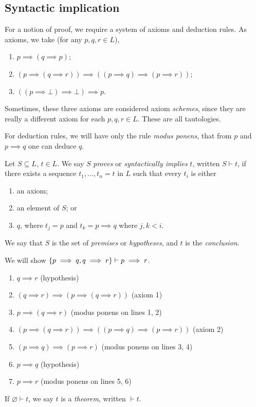\subsection{Syntactic implication}
For a notion of proof, we require a system of axioms and deduction rules.
As axioms, we take (for any \( p, q, r \in L \)),
\begin{enumerate}
    \item \( p \implies (q \implies p) \);
    \item \( (p \implies (q \implies r)) \implies ((p \implies q) \implies (p \implies r)) \);
    \item \( ((p \implies \bot) \implies \bot) \implies p \).
\end{enumerate}
\begin{remark}
    Sometimes, these three axioms are considered axiom \emph{schemes}, since they are really a different axiom for each \( p, q, r \in L \).
    These are all tautologies.
\end{remark}
For deduction rules, we will have only the rule \emph{modus ponens}, that from \( p \) and \( p \implies q \) one can deduce \( q \).
\begin{definition}
    Let \( S \subseteq L \), \( t \in L \).
    We say \( S \) \emph{proves} or \emph{syntactically implies} \( t \), written \( S \vdash t \), if there exists a sequence \( t_1, \dots, t_n = t \) in \( L \) such that every \( t_i \) is either
    \begin{enumerate}
        \item an axiom;
        \item an element of \( S \); or
        \item \( q \), where \( t_j = p \) and \( t_k = p \implies q \) where \( j, k < i \).
    \end{enumerate}
    We say that \( S \) is the set of \emph{premises} or \emph{hypotheses}, and \( t \) is the \emph{conclusion}.
\end{definition}
\begin{example}
    We will show \( \qty{p \implies q, q \implies r} \vdash p \implies r \).
    \begin{enumerate}[1.]
        \item \( q \implies r \) (hypothesis)
        \item \( (q \implies r) \implies (p \implies (q \implies r)) \) (axiom 1)
        \item \( p \implies (q \implies r) \) (modus ponens on lines 1, 2)
        \item \( (p \implies (q \implies r)) \implies ((p \implies q) \implies (p \implies r)) \) (axiom 2)
        \item \( (p \implies q) \implies (p \implies r) \) (modus ponens on lines 3, 4)
        \item \( p \implies q \) (hypothesis)
        \item \( p \implies r \) (modus ponens on lines 5, 6)
    \end{enumerate}
\end{example}
\begin{definition}
    If \( \varnothing \vdash t \), we say \( t \) is a \emph{theorem}, written \( \vdash t \).
\end{definition}
